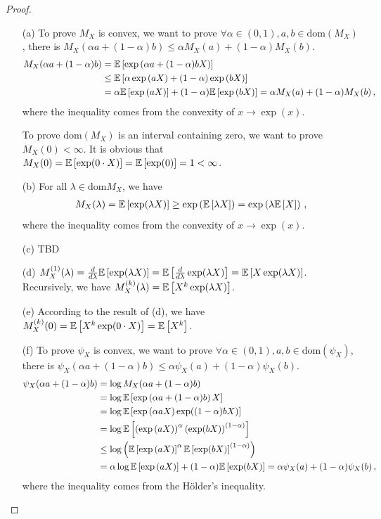 \begin{proof}

\begin{enumerate}
	\item[(a)] To prove $M_X$ is convex, we want to prove $\forall \alpha \in (0,1), a,b\in \text{dom}(M_X)$, there is $M_X(\alpha 
	 a + (1-\alpha)b) \le \alpha M_X(a) + (1-\alpha)M_X(b)$. 
	 \begin{align*}
	 	M_X(\alpha a + (1-\alpha)b) &= \mathbb{E} \left[ \exp\left( \alpha a + (1-\alpha)b X \right)\right] \\
	 	&\le \mathbb{E} \left[ \alpha \exp\left( a X\right)+ (1-\alpha)\exp\left(b X\right) \right] \\
	 	&= \alpha \mathbb{E} \left[\exp\left( a X\right)\right]+(1-\alpha)\mathbb{E} \left[\exp\left(b X\right)\right] = \alpha M_X(a) + (1-\alpha)M_X(b)\,,
	 \end{align*}
	 where the inequality comes from the convexity of $x \to \exp(x)$.

	 To prove $\text{dom}(M_X)$ is an interval containing zero, we want to prove $M_X(0)<\infty$. It is obvious that $ M_X(0) = \mathbb{E} \left[\exp(0\cdot X)\right] = \mathbb{E} \left[\exp(0)\right] =1<\infty $. 
	\item[(b)] For all $\lambda \in \text{dom}M_X$, we have
	\begin{align*}
		M_X(\lambda) = \mathbb{E} \left[ \exp(\lambda X) \right] \ge \exp\left(\mathbb{E} \left[\lambda X\right]\right) = \exp\left(\lambda\mathbb{E} \left[ X\right]\right)\,,
	\end{align*}
	where the inequality comes from the convexity of $x \to \exp(x)$.
	\item[(c)] TBD
	\item[(d)] $M^{(1)}_X(\lambda) = \frac{d}{d\lambda} \mathbb{E} \left[\exp(\lambda X)\right]= \mathbb{E} \left[\frac{d}{d\lambda} \exp(\lambda X)\right] = \mathbb{E} \left[X \exp(\lambda X)\right]$. 
	Recursively, we have $M^{(k)}_X(\lambda) = \mathbb{E} \left[X^k \exp(\lambda X)\right]$. 
	\item[(e)] According to the result of (d), we have $M^{(k)}_X(0) = \mathbb{E} \left[X^k \exp(0\cdot X)\right] = \mathbb{E} \left[X^k\right]$.
	\item[(f)] To prove $\psi_X$ is convex, we want to prove $\forall \alpha \in (0,1), a,b\in \text{dom}(\psi_X)$, there is $\psi_X(\alpha a + (1-\alpha)b) \le \alpha \psi_X(a) + (1-\alpha)\psi_X(b)$.
	\begin{align*}
		\psi_X(\alpha a + (1-\alpha)b) &= \log M_X( \alpha a + (1-\alpha)b ) \\
		&= \log \mathbb{E} \left[\exp\left( \alpha a + (1-\alpha)b\right)X\right] \\
		&= \log \mathbb{E} \left[\exp\left( \alpha aX \right) \exp((1-\alpha)bX)\right] \\
		&= \log \mathbb{E} \left[\left(\exp\left( aX \right)\right)^{\alpha} \left(\exp(bX)\right)^{(1-\alpha)}\right]\\
		&\le  \log \left( \mathbb{E} \left[\exp\left( aX \right)\right]^{\alpha } \mathbb{E} \left[\exp(bX)\right]^{(1-\alpha)} \right) \\
		&= \alpha \log \mathbb{E} \left[ \exp\left( aX \right) \right] + (1-\alpha) \mathbb{E} \left[\exp(bX)\right] = \alpha \psi_X(a) + (1-\alpha)\psi_X(b) \,,
	\end{align*}
	where the inequality comes from the Hölder's inequality. 
\end{enumerate}

\end{proof}


